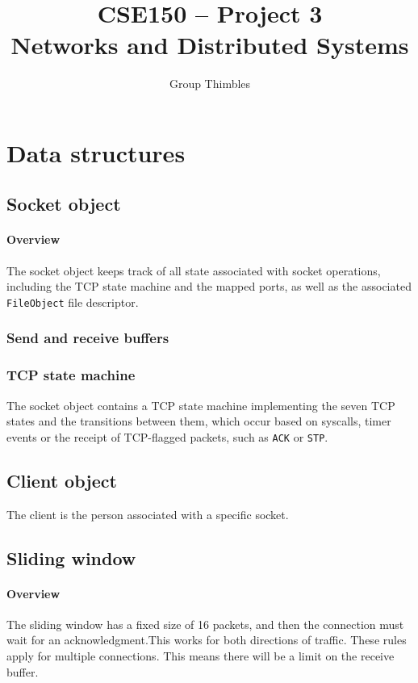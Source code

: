 \documentclass[]{article}
\title{CSE150 -- Project 3\\ Networks and Distributed Systems}
\author{Group Thimbles}
\begin{document}
\maketitle
\tableofcontents

\section{Data structures}

\subsection{Socket object}
\paragraph{Overview}
The socket object keeps track of all state associated with socket operations, including the TCP state machine and the mapped ports, as well as the associated \texttt{FileObject} file descriptor.


\subsubsection{Send and receive buffers}

\subsubsection{TCP state machine}

The socket object contains a TCP state machine implementing the seven TCP states and the transitions between them, which occur based on syscalls, timer events or the receipt of TCP-flagged packets, such as \texttt{ACK} or \texttt{STP}.

\subsection{Client object}
The client is the person associated with a specific socket.
\subsection{Sliding window}
\paragraph{Overview}
The sliding window has a fixed size of 16 packets, and then the connection must wait for an acknowledgment.This works for both directions of traffic. These rules apply for multiple connections. This means there will be a limit on the receive buffer. 
\end{document}
